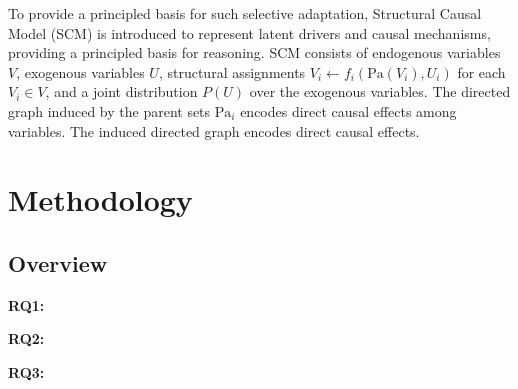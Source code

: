 ﻿\documentclass[journal]{IEEEtran}
\newenvironment{auditproblemblock}{\begingroup\color{red}}{\endgroup}
\begin{document}
\begin{auditproblemblock}
To provide a principled basis for such selective adaptation, Structural Causal Model (SCM) is introduced to represent latent drivers and causal mechanisms, providing a principled basis for reasoning. SCM consists of endogenous variables $V$, exogenous variables $U$, structural assignments $V_i \leftarrow f_i(\mathrm{Pa}(V_i), U_i)$ for each $V_i \in V$, and a joint distribution $P(U)$ over the exogenous variables. The directed graph induced by the parent sets $\mathrm{Pa}_i$ encodes direct causal effects among variables. The induced directed graph encodes direct causal effects.

\section{Methodology}
\subsection{Overview}

\textbf{RQ1:} 


\textbf{RQ2:} 


\textbf{RQ3:} 



\end{auditproblemblock}
\end{document}
